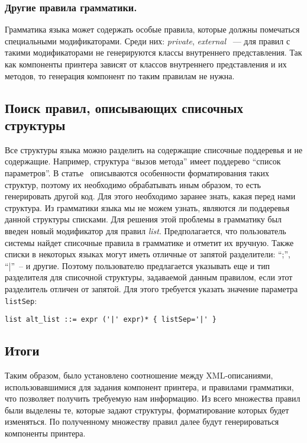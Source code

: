 \subsubsection{Другие правила грамматики.}
Грамматика языка может содержать особые правила, которые должны помечаться специальными модификаторами.
Среди них: \emph{private}, \emph{external} ~--- для правил с такими модификаторами не генерируются классы внутреннего представления.
Так как компоненты принтера зависят от классов внутреннего представления и их методов, то генерация компонент по таким правилам не нужна.

\subsection{Поиск правил, описывающих списочных структуры}
Все структуры языка можно разделить на содержащие списочные поддеревья и не содержащие.
Например, структура ``вызов метода'' имеет поддерево ``список параметров''.
В статье~\cite{paper:while} описываются особенности форматирования таких структур, поэтому их необходимо обрабатывать иным образом, то есть генерировать другой код.
Для этого необходимо заранее знать, какая перед нами структура.
Из грамматики языка мы не можем узнать, являются ли поддеревья данной структуры списками.
Для решения этой проблемы в грамматику был введен новый модификатор для правил \emph{list}.
Предполагается, что пользователь системы найдет списочные правила в грамматике и отметит их вручную.
Также списки в некоторых языках могут иметь отличные от запятой разделители: ``;'', ``|''~-- и другие.
Поэтому пользователю предлагается указывать еще и тип разделителя для списочной структуры, задаваемой данным правилом, если этот разделитель отличен от запятой.
Для этого требуется указать значение параметра \lstinline{listSep}:

{
\begin{lstlisting}
list alt_list ::= expr ('|' expr)* { listSep='|' }
\end{lstlisting}
}
\subsection{Итоги}
Таким образом, было установлено соотношение между XML-описаниями, использовавшимися для задания компонент принтера, и правилами грамматики, что позволяет получить требуемую нам информацию.
Из всего множества правил были выделены те, которые задают структуры, форматирование которых будет изменяться.
По полученному множеству правил далее будут генерироваться компоненты принтера.
